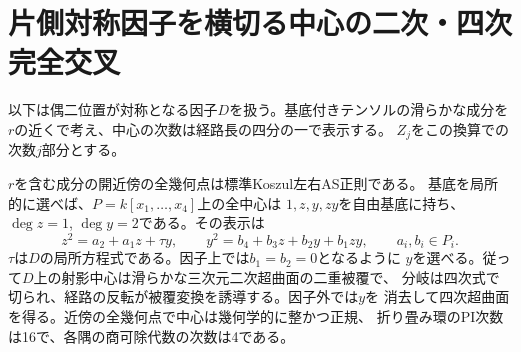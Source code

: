 \section{片側対称因子を横切る中心の二次・四次完全交叉}
\label{sec:symmetric-center-cover}
以下は偶二位置が対称となる因子$D$を扱う。基底付きテンソルの滑らかな成分を
$r$の近くで考え、中心の次数は経路長の四分の一で表示する。
$Z_j$をこの換算での次数$j$部分とする。

\begin{theorem}\label{thm:symmetric-center-cover}
$r$を含む成分の開近傍の全幾何点は標準Koszul左右AS正則である。
基底を局所的に選べば、$P=k[x_1,\ldots,x_4]$上の全中心は
$1,z,y,zy$を自由基底に持ち、$\deg z=1$, $\deg y=2$である。その表示は
\[
 z^2=a_2+a_1z+\tau y,\qquad
 y^2=b_4+b_3z+b_2y+b_1zy,\qquad a_i,b_i\in P_i .
\]
$\tau$は$D$の局所方程式である。因子上では$b_1=b_2=0$となるように
$y$を選べる。従って$D$上の射影中心は滑らかな三次元二次超曲面の二重被覆で、
分岐は四次式で切られ、経路の反転が被覆変換を誘導する。因子外では$y$を
消去して四次超曲面を得る。近傍の全幾何点で中心は幾何学的に整かつ正規、
折り畳み環のPI次数は16で、各隅の商可除代数の次数は4である。
\end{theorem}
